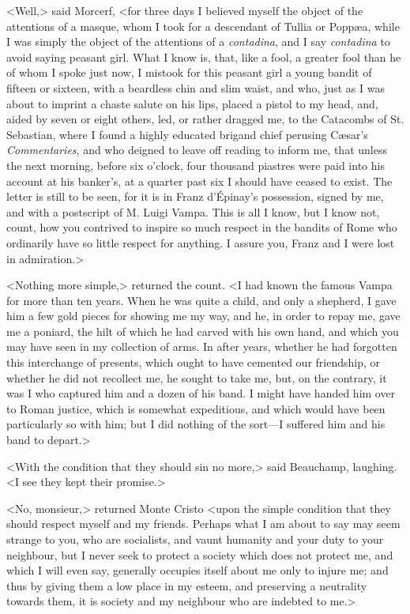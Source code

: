  <Well,> said Morcerf, <for three days I believed myself the object of the attentions of a masque, whom I took for a descendant of Tullia or Poppæa, while I was simply the object of the attentions of a \textit{contadina}, and I say \textit{contadina} to avoid saying peasant girl. What I know is, that, like a fool, a greater fool than he of whom I spoke just now, I mistook for this peasant girl a young bandit of fifteen or sixteen, with a beardless chin and slim waist, and who, just as I was about to imprint a chaste salute on his lips, placed a pistol to my head, and, aided by seven or eight others, led, or rather dragged me, to the Catacombs of St. Sebastian, where I found a highly educated brigand chief perusing Cæsar's \textit{Commentaries}, and who deigned to leave off reading to inform me, that unless the next morning, before six o'clock, four thousand piastres were paid into his account at his banker's, at a quarter past six I should have ceased to exist. The letter is still to be seen, for it is in Franz d'Épinay's possession, signed by me, and with a postscript of M. Luigi Vampa. This is all I know, but I know not, count, how you contrived to inspire so much respect in the bandits of Rome who ordinarily have so little respect for anything. I assure you, Franz and I were lost in admiration.> 

 <Nothing more simple,> returned the count. <I had known the famous Vampa for more than ten years. When he was quite a child, and only a shepherd, I gave him a few gold pieces for showing me my way, and he, in order to repay me, gave me a poniard, the hilt of which he had carved with his own hand, and which you may have seen in my collection of arms. In after years, whether he had forgotten this interchange of presents, which ought to have cemented our friendship, or whether he did not recollect me, he sought to take me, but, on the contrary, it was I who captured him and a dozen of his band. I might have handed him over to Roman justice, which is somewhat expeditious, and which would have been particularly so with him; but I did nothing of the sort—I suffered him and his band to depart.> 

 <With the condition that they should sin no more,> said Beauchamp, laughing. <I see they kept their promise.> 

 <No, monsieur,> returned Monte Cristo <upon the simple condition that they should respect myself and my friends. Perhaps what I am about to say may seem strange to you, who are socialists, and vaunt humanity and your duty to your neighbour, but I never seek to protect a society which does not protect me, and which I will even say, generally occupies itself about me only to injure me; and thus by giving them a low place in my esteem, and preserving a neutrality towards them, it is society and my neighbour who are indebted to me.> 

